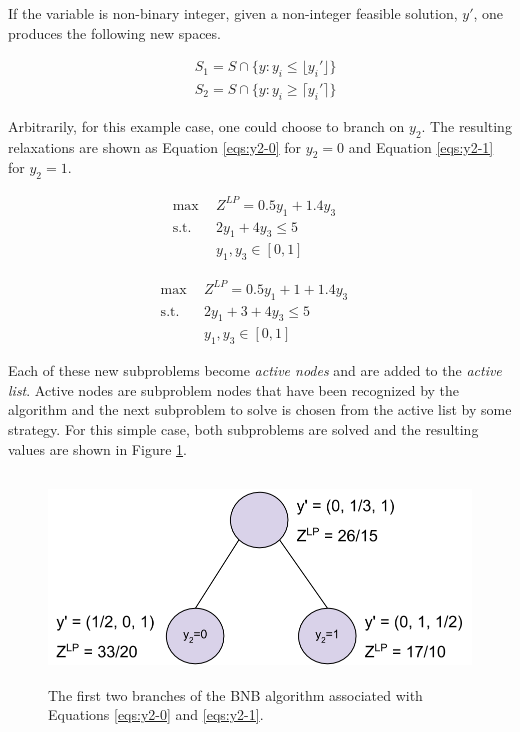 If the variable is non-binary integer, given a non-integer feasible solution,
$y'$, one produces the following new spaces.

\begin{equation}
\begin{split}
& S_1 = S \cap \{y: y_i \leq \lfloor y_i' \rfloor\}
\\
& S_2 = S \cap \{y: y_i \geq \lceil y_i' \rceil\}
\end{split}
\end{equation}

Arbitrarily, for this example case, one could choose to branch on
$y_2$. The resulting relaxations are shown as Equation \ref{eqs:y2-0} for $y_2 =
0$ and Equation \ref{eqs:y2-1} for $y_2 = 1$.

\begin{subequations}\label{eqs:y2-0}
  \begin{align}
    \max \:\: & 
    Z^{LP} = 0.5 y_1 + 1.4 y_3
    & \\
    \text{s.t.} \:\: &
    2 y_1 + 4 y_3 \leq 5 
    & \\
    &
    y_1, y_3 \in [0, 1]
  \end{align}
\end{subequations}

\begin{subequations}\label{eqs:y2-1}
  \begin{align}
    \max \:\: & 
    Z^{LP} = 0.5 y_1 + 1 + 1.4 y_3
    & \\
    \text{s.t.} \:\: &
    2 y_1 + 3 + 4 y_3 \leq 5 
    & \\
    &
    y_1, y_3 \in [0, 1]
  \end{align}
\end{subequations}

Each of these new subproblems become \textit{active nodes} and are added to
the \textit{active list}. Active nodes are subproblem nodes that have been
recognized by the algorithm and the next subproblem to solve is chosen from the
active list by some strategy. For this simple case, both subproblems are solved
and the resulting values are shown in Figure \ref{fig:branch}.

\begin{figure}[H]
  \begin{center}
    \includegraphics[height=5.5cm]{./backmatter/figs/branch.png}
  \caption{The first two branches of the BNB algorithm associated with 
  Equations \ref{eqs:y2-0} and \ref{eqs:y2-1}.}
  \label{fig:branch}
  \end{center}
\end{figure}

